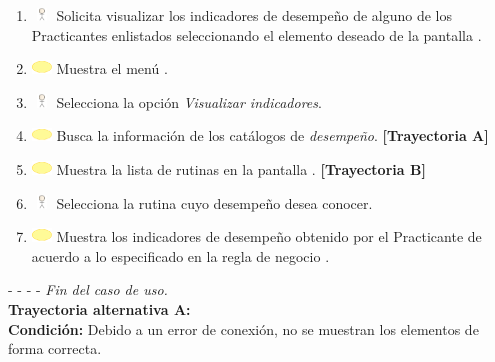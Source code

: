 \begin{enumerate}
	\item \includegraphics[width=15pt, height=10pt]{./Figuras/iconosCU/usuario.png} Solicita visualizar los indicadores de desempeño de alguno de los Practicantes enlistados seleccionando el elemento deseado de la pantalla .
	\item \includegraphics[width=15pt]{./Figuras/iconosCU/herramienta.png} Muestra el menú .
	\item \includegraphics[width=15pt, height=10pt]{./Figuras/iconosCU/usuario.png} Selecciona la opción \textit{Visualizar indicadores}.
	\item \includegraphics[width=15pt]{./Figuras/iconosCU/herramienta.png} Busca la información de los catálogos de \textit{desempeño}. \textbf{[Trayectoria A]}
	\item \includegraphics[width=15pt]{./Figuras/iconosCU/herramienta.png} Muestra la lista de rutinas en la pantalla . \textbf{[Trayectoria B]}
	\item \includegraphics[width=15pt, height=10pt]{./Figuras/iconosCU/usuario.png} Selecciona la rutina cuyo desempeño desea conocer.
	\item \includegraphics[width=15pt]{./Figuras/iconosCU/herramienta.png} Muestra los indicadores de desempeño obtenido por el Practicante de acuerdo a lo especificado en la regla de negocio .
\end{enumerate}
	
- - - - \textit{Fin del caso de uso.} \\

\textbf{\large{Trayectoria alternativa A:}}\\
\textbf{Condición: } Debido a un error de conexión, no se muestran los elementos de forma correcta.

